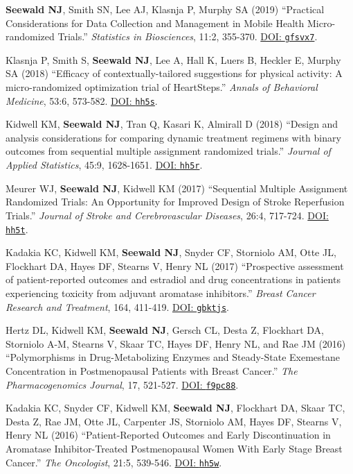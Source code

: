 \documentclass[letterpaper,11pt]{article} %
\begin{document}
\begin{etaremune}
		\item \textbf{Seewald NJ}, Smith SN, Lee AJ, Klasnja P, Murphy SA (2019) ``Practical Considerations for Data Collection and Management in Mobile Health Micro-randomized Trials.'' \textit{Statistics in Biosciences}, 11:2, 355-370. \href{https://doi.org/gfsvx7}{DOI: \texttt{gfsvx7}}.
		
		\item Klasnja P, Smith S, \textbf{Seewald NJ}, Lee A, Hall K, Luers B, Heckler E, Murphy SA (2018) ``Efficacy of contextually-tailored suggestions for physical activity: A micro-randomized optimization trial of HeartSteps.'' \textit{Annals of Behavioral Medicine}, 53:6, 573-582. \href{https://doi.org/hh5s}{DOI: \texttt{hh5s}}.
			
		\item Kidwell KM, \textbf{Seewald NJ}, Tran Q, Kasari K, Almirall D (2018) ``Design and analysis considerations for comparing dynamic treatment regimens with binary outcomes from sequential multiple assignment randomized trials.'' \textit{Journal of Applied Statistics}, 45:9, 1628-1651. \href{https://doi.org/hh5r}{DOI: \texttt{hh5r}}.
		
		\item Meurer WJ, \textbf{Seewald NJ}, Kidwell KM (2017) ``Sequential Multiple Assignment Randomized Trials: An Opportunity for Improved Design of Stroke Reperfusion Trials.'' \textit{Journal of Stroke and Cerebrovascular Diseases}, 26:4, 717-724. \href{https://doi.org/hh5t}{DOI: \texttt{hh5t}}.
			
		\item Kadakia KC, Kidwell KM, \textbf{Seewald NJ}, Snyder CF, Storniolo AM, Otte JL, Flockhart DA, Hayes DF, Stearns V, Henry NL (2017) ``Prospective assessment of patient-reported outcomes and estradiol and drug concentrations in patients experiencing toxicity from adjuvant aromatase inhibitors.'' \textit{Breast Cancer Research and Treatment}, 164, 411-419. \href{https://doi.org/gbktjs}{DOI: \texttt{gbktjs}}.

		\item Hertz DL, Kidwell KM, \textbf{Seewald NJ}, Gersch CL, Desta Z, Flockhart DA, Storniolo A-M, Stearns V, Skaar TC, Hayes DF, Henry NL, and Rae JM (2016) ``Polymorphisms in Drug-Metabolizing Enzymes and Steady-State Exemestane Concentration in Postmenopausal Patients with Breast Cancer.'' \textit{The Pharmacogenomics Journal}, 17, 521-527. \href{https://doi.org/f9pc88}{DOI: \texttt{f9pc88}}.
			
		\item Kadakia KC, Snyder CF, Kidwell KM, \textbf{Seewald NJ}, Flockhart DA, Skaar TC, Desta Z, Rae JM, Otte JL, Carpenter JS, Storniolo AM, Hayes DF, Stearns V, Henry NL (2016) ``Patient-Reported Outcomes and Early Discontinuation in Aromatase Inhibitor-Treated Postmenopausal Women With Early Stage Breast Cancer.'' \textit{The Oncologist}, 21:5, 539-546. \href{https://doi.org/hh5w}{DOI: \texttt{hh5w}}.
			

\end{etaremune}
\end{document}
